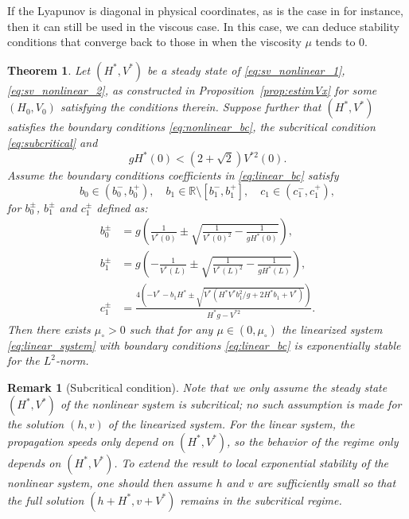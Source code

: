 \documentclass[11pt]{article}
\newtheorem{rmk}{Remark}[section]
\newtheorem{theorem}{Theorem}[section]
\begin{document}
If the Lyapunov is diagonal in physical coordinates, as is the case in \cite{bastin2017quadratic} for instance, then it can still be used in the viscous case. In this case, we can deduce stability conditions that converge back to those in \cite{bastin2017quadratic} when the viscosity $\mu$ tends to 0. 

\begin{theorem}
\label{th:main}
{Let $(H^{*},V^{*})$ be a steady state of \eqref{eq:sv_nonlinear_1}, \eqref{eq:sv_nonlinear_2}, as constructed in Proposition~\ref{prop:estimVx} for some $(H_0,V_0)$ satisfying the conditions therein. Suppose further that $(H^{*},V^{*})$ satisfies the} boundary conditions \eqref{eq:nonlinear_bc}, the subcritical condition \eqref{eq:subcritical} and 
\begin{equation}
\label{eq:assumpsteady}
gH^{*}(0)<(2+\sqrt{2})V^{*2}(0).
\end{equation}
Assume the boundary conditions coefficients in \eqref{eq:linear_bc} satisfy 
\begin{equation}
    b_0 \in (b_0^-, b_0^+), \quad b_1 \in \mathbb{R} \setminus [b_1^-, b_1^+], \quad c_1 \in (c_1^-, c_1^+),
    \label{eq:bc_coef_constraints}
\end{equation}
for $b_0^\pm$, $b_1^\pm$ and $c_1^\pm$ {defined as:}
{
\begin{align}
    b_0^\pm &= g \left( \frac{1}{V^*(0)} \pm \sqrt{ \frac{1}{V^*(0)^2} - \frac{1}{g H^*(0)} } \right), \label{eq:bc_b0} \\
    b_1^\pm &= g \left( - \frac{1}{V^*(L)} \pm \sqrt{ \frac{1}{V^*(L)^2} - \frac{1}{g H^*(L)} } \right) \label{eq:bc_b1}, \\
    c_1^\pm &= \frac{4 \left( - V^* - b_1 H^* \pm \sqrt{V^* (H^*V^*b_1^2/g + 2 H^*b_1 + V^*)} \right)}{H^* g - V^{*2}}. \label{eq:bc_c1}
\end{align}
}
Then there exists ${\mu_{\circ}}>0$ such that for any $\mu\in(0,{\mu_{\circ}})$ {the linearized system \eqref{eq:linear_system} with boundary conditions \eqref{eq:linear_bc} 
is exponentially stable for the ${L^{2}}$-norm}.
\end{theorem}
{
\begin{rmk}[Subcritical condition]
Note that we only assume the steady state $(H^*, V^*)$ of the nonlinear system is subcritical; no such assumption is made for the solution $(h, v)$ of the linearized system. For the linear system, the propagation speeds only depend on $(H^*, V^*)$, so the behavior of the regime only depends on $(H^*, V^*)$. To extend the result to local exponential stability of the nonlinear system, one should then assume $h$ and $v$ are sufficiently small so that the full solution $(h+H^{*},v+V^{*})$ remains in the subcritical regime.
\end{rmk}
}
\end{document}
